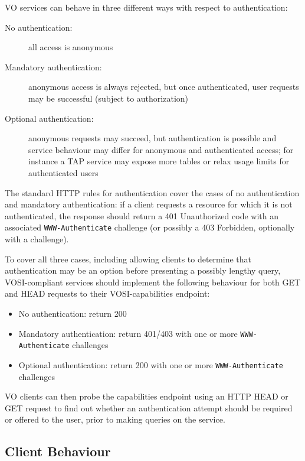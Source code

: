 \documentclass[11pt,a4paper]{ivoa}
\newcommand{\header}[1]{{\tt #1}}
\begin{document}
VO services can behave in three different ways with respect to authentication:
\begin{description}
  \item[No authentication:]
       all access is anonymous
  \item[Mandatory authentication:]
       anonymous access is always rejected, but once authenticated,
       user requests may be successful (subject to authorization)
  \item[Optional authentication:]
       anonymous requests may succeed, but authentication is possible
       and service behaviour may differ for anonymous and authenticated access;
       for instance a TAP service may expose more tables or relax
       usage limits for authenticated users
\end{description}

The standard HTTP rules for authentication cover the cases of
no authentication and mandatory authentication:
if a client requests a resource for which it is not authenticated,
the response should return a 401 Unauthorized code with an associated
\header{WWW-Authenticate} challenge
(or possibly a 403 Forbidden, optionally with a challenge).

To cover all three cases,
including allowing clients to determine that authentication may be an
option before presenting a possibly lengthy query,
VOSI-compliant services should implement the following behaviour
for both GET and HEAD requests to their VOSI-capabilities endpoint:
\begin{itemize}
  \item No authentication:
        return 200
  \item Mandatory authentication:
        return 401/403 with one or more \header{WWW-Authenticate} challenges
  \item Optional authentication:
        return 200 with one or more \header{WWW-Authenticate} challenges
\end{itemize}
VO clients can then probe the capabilities endpoint using an HTTP HEAD
or GET request to find out whether an authentication attempt should be
required or offered to the user, prior to making queries on the service.

\subsection{Client Behaviour}
\end{document}
